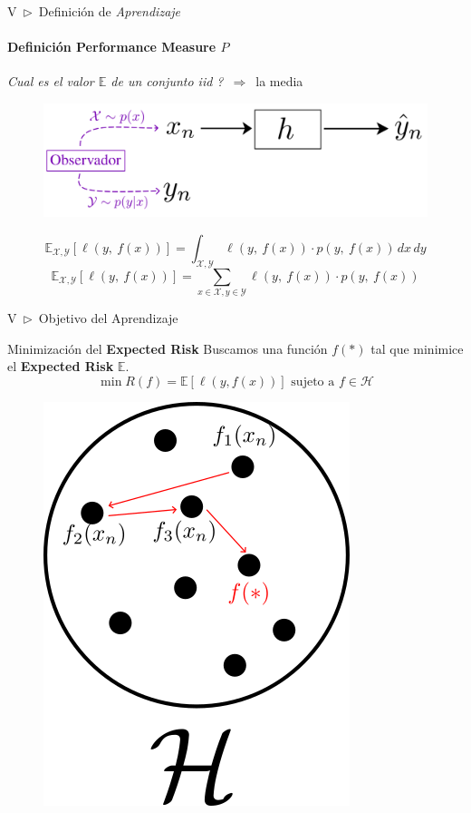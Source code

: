 \documentclass[xcolor=dvipsnames]{beamer}
\begin{document}
    \begin{frame}{V~$\rhd$~Definición de \textit{Aprendizaje}}
    \framesubtitle{Definición Performance Measure \( P \)}
        \textit{Cual es el valor $\mathbb{E}$ de un conjunto iid ?}~$\Rightarrow$~la media
        \begin{figure}
            \centering
            \includegraphics[width=0.8\linewidth]{imgs/def03/measure05.png}
        \end{figure}
        \vspace{3mm}
        \begin{equation*}
            \mathbb{E}_{\mathcal{X},\mathcal{Y}}\left[\ell\left(y,~f\left(x\right)\right)\right] = \int_{\mathcal{X},\mathcal{Y}}{\ell\left(y,~f\left(x\right)\right)\cdot p\left(y,~f\left(x\right)\right)}\,dx\,dy
        \end{equation*}
        \vspace{3mm}
        \begin{equation*}
            \mathbb{E}_{\mathcal{X},\mathcal{Y}}\left[\ell\left(y,~f\left(x\right)\right)\right] = \sum_{x\in\mathcal{X},y\in\mathcal{Y}}{\ell\left(y,~f\left(x\right)\right)\cdot p\left(y,~f\left(x\right)\right)}
        \end{equation*}
    \end{frame}

    \begin{frame}{V~$\rhd$~Objetivo del Aprendizaje}
        \begin{block}{Minimización del \textbf{Expected Risk}}
            Buscamos una función $f(*)$ tal que minimice el \textbf{Expected Risk} $\mathbb{E}$.
            \begin{equation*}
                \min R(f)=\mathbb{E}\left[\ell\left(y,f\left(x\right)\right)\right]\text{ sujeto a } f\in\mathcal{H}
            \end{equation*}
        \end{block}
        \begin{figure}
            \centering
            \includegraphics[width=0.25\linewidth]{imgs/def03/measure06.png}
        \end{figure}
    \end{frame}
\end{document}
